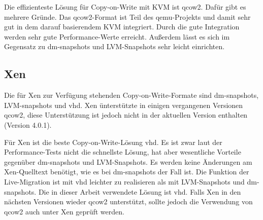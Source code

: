 Die effizienteste Lösung für Copy-on-Write mit KVM ist qcow2. Dafür gibt es mehrere Gründe. Das qcow2-Format ist Teil des qemu-Projekts und damit sehr gut in dem darauf basierendem KVM integriert. Durch die gute Integration werden sehr gute Performance-Werte erreicht. Außerdem lässt es sich im Gegensatz zu dm-snapshots und LVM-Snapshots sehr leicht einrichten.

\subsection{Xen}
Die für Xen zur Verfügung stehenden Copy-on-Write-Formate sind dm-snapshots, LVM-snapshots und vhd. Xen ünterstützte in einigen vergangenen Versionen qcow2, diese Unterstützung ist jedoch nicht in der aktuellen Version enthalten (Version 4.0.1). \cite{qcow2support}

Für Xen ist die beste Copy-on-Write-Lösung vhd. Es ist zwar laut der Performance-Tests nicht die schnellste Lösung, hat aber wesentliche Vorteile gegenüber dm-snapshots und LVM-Snapshots. Es werden keine Änderungen am Xen-Quelltext benötigt, wie es bei dm-snapshots der Fall ist. Die Funktion der Live-Migration ist mit vhd leichter zu realisieren als mit LVM-Snapshots und dm-snapshots. Die in dieser Arbeit verwendete Lösung ist vhd. Falls Xen in den nächsten Versionen wieder qcow2 unterstützt, sollte jedoch die Verwendung von qcow2 auch unter Xen geprüft werden. \cite{racecondition}